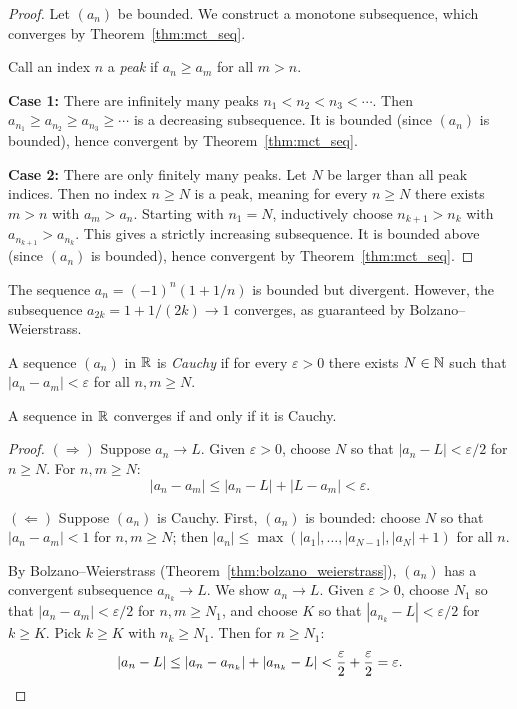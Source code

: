 \documentclass[11pt,a4paper]{article}
\begin{document}
\begin{proof}
Let $(a_n)$ be bounded. We construct a monotone subsequence, which
converges by Theorem~\ref{thm:mct_seq}.

Call an index $n$ a \emph{peak} if $a_n \ge a_m$ for all $m > n$.

\textbf{Case 1:} There are infinitely many peaks $n_1 < n_2 < n_3 <
\cdots$. Then $a_{n_1} \ge a_{n_2} \ge a_{n_3} \ge \cdots$ is a
decreasing subsequence. It is bounded (since $(a_n)$ is bounded), hence
convergent by Theorem~\ref{thm:mct_seq}.

\textbf{Case 2:} There are only finitely many peaks. Let $N$ be larger
than all peak indices. Then no index $n \ge N$ is a peak, meaning for
every $n \ge N$ there exists $m > n$ with $a_m > a_n$. Starting with
$n_1 = N$, inductively choose $n_{k+1} > n_k$ with
$a_{n_{k+1}} > a_{n_k}$. This gives a strictly increasing subsequence.
It is bounded above (since $(a_n)$ is bounded), hence convergent by
Theorem~\ref{thm:mct_seq}.
\end{proof}

\begin{example}
\label{ex:subsequence}
The sequence $a_n = (-1)^n(1 + 1/n)$ is bounded but divergent. However,
the subsequence $a_{2k} = 1 + 1/(2k) \to 1$ converges, as guaranteed by
Bolzano--Weierstrass.
\end{example}

\begin{definition}
\label{def:cauchy}
A sequence $(a_n)$ in $\mathbb{R}$ is \emph{Cauchy} if for every
$\varepsilon > 0$ there exists $N \in \mathbb{N}$ such that
$|a_n - a_m| < \varepsilon$ for all $n, m \ge N$.
\end{definition}

\begin{theorem}
\label{thm:cauchy_complete}
A sequence in $\mathbb{R}$ converges if and only if it is Cauchy.
\end{theorem}

\begin{proof}
$(\Rightarrow)$ Suppose $a_n \to L$. Given $\varepsilon > 0$, choose $N$
so that $|a_n - L| < \varepsilon/2$ for $n \ge N$. For $n, m \ge N$:
\[
  |a_n - a_m| \le |a_n - L| + |L - a_m| < \varepsilon.
\]

$(\Leftarrow)$ Suppose $(a_n)$ is Cauchy. First, $(a_n)$ is bounded:
choose $N$ so that $|a_n - a_m| < 1$ for $n, m \ge N$; then
$|a_n| \le \max(|a_1|, \ldots, |a_{N-1}|, |a_N| + 1)$ for all $n$.

By Bolzano--Weierstrass (Theorem~\ref{thm:bolzano_weierstrass}),
$(a_n)$ has a convergent subsequence $a_{n_k} \to L$. We show
$a_n \to L$. Given $\varepsilon > 0$, choose $N_1$ so that
$|a_n - a_m| < \varepsilon/2$ for $n, m \ge N_1$, and choose $K$ so
that $|a_{n_k} - L| < \varepsilon/2$ for $k \ge K$. Pick $k \ge K$
with $n_k \ge N_1$. Then for $n \ge N_1$:
\[
  |a_n - L| \le |a_n - a_{n_k}| + |a_{n_k} - L|
  < \frac{\varepsilon}{2} + \frac{\varepsilon}{2} = \varepsilon.
  \qedhere
\]
\end{proof}
\end{document}
